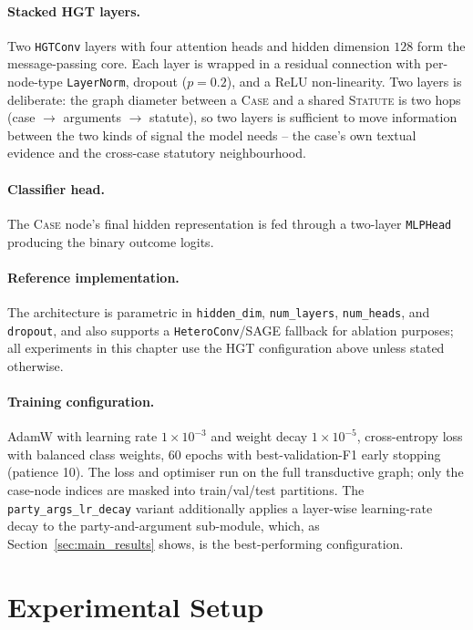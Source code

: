 \paragraph{Stacked HGT layers.} Two \texttt{HGTConv} layers with
four attention heads and hidden dimension $128$ form the
message-passing core. Each layer is wrapped in a residual connection
with per-node-type \texttt{LayerNorm}, dropout ($p=0.2$), and a ReLU
non-linearity. Two layers is deliberate: the graph diameter between a
\textsc{Case} and a shared \textsc{Statute} is two hops
(case $\to$ arguments $\to$ statute), so two layers is sufficient to
move information between the two kinds of signal the model needs --
the case's own textual evidence and the cross-case statutory
neighbourhood.

\paragraph{Classifier head.} The \textsc{Case} node's final hidden
representation is fed through a two-layer \texttt{MLPHead} producing
the binary outcome logits.

\paragraph{Reference implementation.}
The architecture is parametric in \texttt{hidden\_dim},
\texttt{num\_layers}, \texttt{num\_heads}, and \texttt{dropout}, and
also supports a \texttt{HeteroConv}/SAGE fallback for ablation
purposes; all experiments in this chapter use the HGT configuration
above unless stated otherwise.

\paragraph{Training configuration.} AdamW with learning rate
$1\!\times\!10^{-3}$ and weight decay $1\!\times\!10^{-5}$, cross-entropy
loss with balanced class weights, 60 epochs with best-validation-F1
early stopping (patience 10). The loss and optimiser run on the full
transductive graph; only the case-node indices are masked into
train/val/test partitions. The \texttt{party\_args\_lr\_decay}
variant additionally applies a layer-wise learning-rate decay to the
party-and-argument sub-module, which, as Section~\ref{sec:main_results}
shows, is the best-performing configuration.

\section{Experimental Setup}

